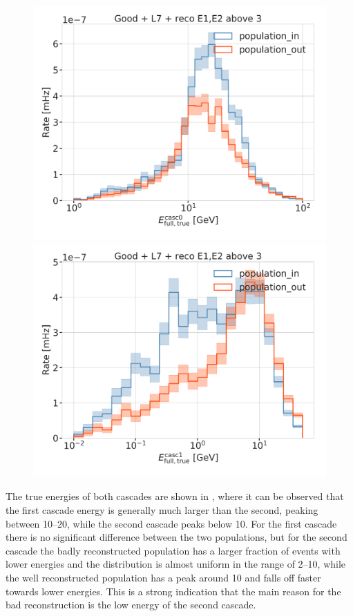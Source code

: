 \begin{figure}[h]
    \centering
    \includegraphics[width=0.49\linewidth]{figures/results/190607/second_population/casc0_energy.png}
    \includegraphics[width=0.49\linewidth]{figures/results/190607/second_population/casc1_energy.png}
    \caption[]{}
\end{figure}

The true energies of both cascades are shown in , where it can be observed that the first cascade energy is generally much larger than the second, peaking between \SIrange[range-phrase={~and~}]{10}{20}{\gev}, while the second cascade peaks below \SI{10}{\gev}. For the first cascade there is no significant difference between the two populations, but for the second cascade the badly reconstructed population has a larger fraction of events with lower energies and the distribution is almost uniform in the range of \SIrange{2}{10}{\gev}, while the well reconstructed population has a peak around \SI{10}{\gev} and falls off faster towards lower energies. This is a strong indication that the main reason for the bad reconstruction is the low energy of the second cascade.


